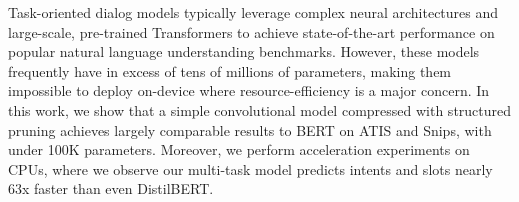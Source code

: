 Task-oriented dialog models typically leverage complex neural architectures and large-scale, pre-trained Transformers to achieve state-of-the-art performance on popular natural language understanding benchmarks. However, these models frequently have in excess of tens of millions of parameters, making them impossible to deploy on-device where resource-efficiency is a major concern. In this work, we show that a simple convolutional model compressed with structured pruning achieves largely comparable results to BERT on ATIS and Snips, with under 100K parameters. Moreover, we perform acceleration experiments on CPUs, where we observe our multi-task model predicts intents and slots nearly 63x faster than even DistilBERT.
